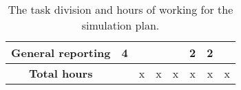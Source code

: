 \begin{center}
\begin{table}[H]
\begin{tabular}{l|c|c|c|c|c|c|c|}
\multicolumn{1}{|l|}{General reporting}    & 4                                     &                           &                            &                             & 2                         & 2                            &                            \\ \hline
\multicolumn{1}{|c|}{\textbf{Total hours}} &                                       & x                         & x                          & x                           & x                         & x                            & x                          \\ \hline
\end{tabular}
\caption{The task division and hours of working for the simulation plan.}
\end{table}
\end{center}
\vspace{-10mm}
